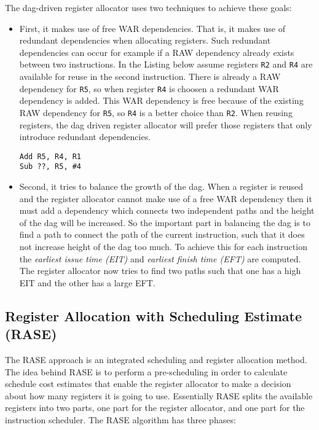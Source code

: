 \documentclass[a4paper,10pt]{article}
\begin{document}
The dag-driven register allocator uses two techniques to achieve these goals:
 \begin{itemize}
  \item First, it makes use of free WAR dependencies. That is, it makes use of redundant dependencies when allocating registers. Such
        redundant dependencies can occur for example if a RAW dependency already exists between two instructions. In the Listing below
        assume registers \lstinline|R2| and \lstinline|R4| are available for reuse in the second instruction. There is already a RAW
        dependency for \lstinline|R5|, so when register \lstinline|R4| is choosen a redundant WAR dependency is added. This WAR
        dependency is free because of the existing RAW dependency for \lstinline|R5|, so \lstinline|R4| is a better choice than
        \lstinline|R2|. When reusing registers, the dag driven register allocator will prefer those registers that only introduce redundant dependencies.


\begin{lstlisting}[xleftmargin=3.5mm]
Add R5, R4, R1
Sub ??, R5, #4
\end{lstlisting}

  \item Second, it tries to balance the growth of the dag. When a register is reused and the register allocator cannot make use of a
        free WAR dependency then it must add a dependency which connects two independent paths and the height of the dag will be
        increased. So the important part in balancing the dag is to find a path to connect the path of the current instruction, such that
        it does not increase height of the dag too much. To achieve this for each instruction the \textit{earliest issue time (EIT)} and
        \textit{earliest finish time (EFT)} are computed. The register allocator now tries to find two paths such that one has a high
        EIT and the other has a large EFT.
 \end{itemize}

\subsection{Register Allocation with Scheduling Estimate (RASE)}
The RASE approach is an integrated scheduling and register allocation method. The idea behind RASE is to perform a pre-scheduling in
order to calculate schedule cost estimates that enable the register allocator to make a decision about how many registers it is going to
use. Essentially RASE splits the available registers into two parts, one part for the register allocator, and one part for the
instruction scheduler. The RASE algorithm has three phases:
\end{document}
